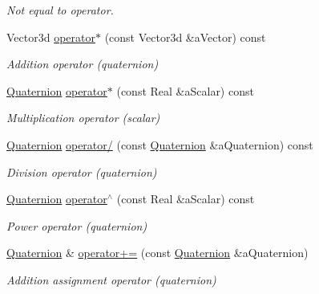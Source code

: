 \begin{DoxyCompactItemize}
\begin{DoxyCompactList}\small\item\em Not equal to operator. \end{DoxyCompactList}\item 
Vector3d \hyperlink{classostk_1_1math_1_1geom_1_1d3_1_1trf_1_1rot_1_1_quaternion_a26bf54c393d70c812538b119d4cb10a3}{operator$\ast$} (const Vector3d \&a\+Vector) const
\begin{DoxyCompactList}\small\item\em Addition operator (quaternion) \end{DoxyCompactList}\item 
\hyperlink{classostk_1_1math_1_1geom_1_1d3_1_1trf_1_1rot_1_1_quaternion}{Quaternion} \hyperlink{classostk_1_1math_1_1geom_1_1d3_1_1trf_1_1rot_1_1_quaternion_a34a6dbc0866d97c3806a0566cc9b23b3}{operator$\ast$} (const Real \&a\+Scalar) const
\begin{DoxyCompactList}\small\item\em Multiplication operator (scalar) \end{DoxyCompactList}\item 
\hyperlink{classostk_1_1math_1_1geom_1_1d3_1_1trf_1_1rot_1_1_quaternion}{Quaternion} \hyperlink{classostk_1_1math_1_1geom_1_1d3_1_1trf_1_1rot_1_1_quaternion_a6f99e31b1d9a0423b90ae83d79847ad4}{operator/} (const \hyperlink{classostk_1_1math_1_1geom_1_1d3_1_1trf_1_1rot_1_1_quaternion}{Quaternion} \&a\+Quaternion) const
\begin{DoxyCompactList}\small\item\em Division operator (quaternion) \end{DoxyCompactList}\item 
\hyperlink{classostk_1_1math_1_1geom_1_1d3_1_1trf_1_1rot_1_1_quaternion}{Quaternion} \hyperlink{classostk_1_1math_1_1geom_1_1d3_1_1trf_1_1rot_1_1_quaternion_a2abd034d5bf5536ffef005c99ff6221e}{operator$^\wedge$} (const Real \&a\+Scalar) const
\begin{DoxyCompactList}\small\item\em Power operator (quaternion) \end{DoxyCompactList}\item 
\hyperlink{classostk_1_1math_1_1geom_1_1d3_1_1trf_1_1rot_1_1_quaternion}{Quaternion} \& \hyperlink{classostk_1_1math_1_1geom_1_1d3_1_1trf_1_1rot_1_1_quaternion_a8bf924ca9949a4645501806e7b6b6074}{operator+=} (const \hyperlink{classostk_1_1math_1_1geom_1_1d3_1_1trf_1_1rot_1_1_quaternion}{Quaternion} \&a\+Quaternion)
\begin{DoxyCompactList}\small\item\em Addition assignment operator (quaternion) \end{DoxyCompactList}\item 

\end{DoxyCompactItemize}
